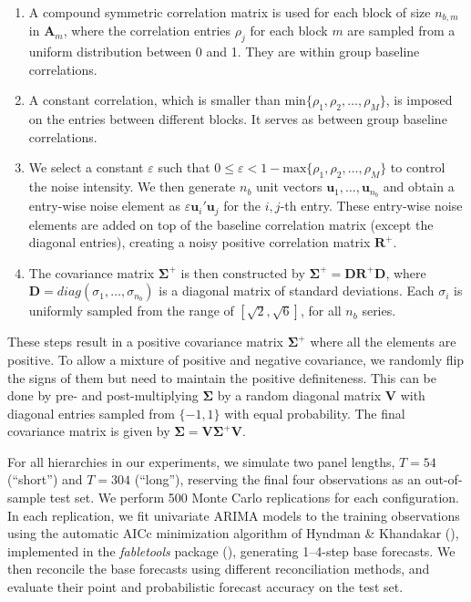 \documentclass[
  11pt,
  letterpaper,
  DIV=11,
  numbers=noendperiod,
  titlepage]{scrartcl}
\begin{document}
\begin{enumerate}
\def\labelenumi{\arabic{enumi}.}
\item
  A compound symmetric correlation matrix is used for each block of size
  \(n_{b,m}\) in \(\boldsymbol{A}_m\), where the correlation entries
  \(\rho_j\) for each block \(m\) are sampled from a uniform
  distribution between 0 and 1. They are within group baseline
  correlations.
\item
  A constant correlation, which is smaller than
  \(\text{min} \{\rho_1, \rho_2, \dots, \rho_M \}\), is imposed on the
  entries between different blocks. It serves as between group baseline
  correlations.
\item
  We select a constant \(\varepsilon\) such that
  \(0 \le \varepsilon < 1 - \text{max} \{\rho_1, \rho_2, \dots, \rho_M \}\)
  to control the noise intensity. We then generate \(n_b\) unit vectors
  \(\boldsymbol{u}_1, \dots, \boldsymbol{u}_{n_b}\) and obtain a
  entry-wise noise element as
  \(\varepsilon \boldsymbol{u}_i' \boldsymbol{u}_j\) for the \(i,j\)-th
  entry. These entry-wise noise elements are added on top of the
  baseline correlation matrix (except the diagonal entries), creating a
  noisy positive correlation matrix \(\boldsymbol{R}^+\).
\item
  The covariance matrix \(\boldsymbol{\Sigma}^+\) is then constructed by
  \(\boldsymbol{\Sigma}^+ = \boldsymbol{D} \boldsymbol{R}^+ \boldsymbol{D}\),
  where \(\boldsymbol{D} = diag(\sigma_1, \dots, \sigma_{n_b})\) is a
  diagonal matrix of standard deviations. Each \(\sigma_i\) is uniformly
  sampled from the range of \([\sqrt{2}, \sqrt{6}]\), for all \(n_b\)
  series.
\end{enumerate}

These steps result in a positive covariance matrix
\(\boldsymbol{\Sigma}^+\) where all the elements are positive. To allow
a mixture of positive and negative covariance, we randomly flip the
signs of them but need to maintain the positive definiteness. This can
be done by pre- and post-multiplying \(\boldsymbol{\Sigma}\) by a random
diagonal matrix \(\boldsymbol{V}\) with diagonal entries sampled from
\(\{-1, 1\}\) with equal probability. The final covariance matrix is
given by
\(\boldsymbol{\Sigma} = \boldsymbol{V} \boldsymbol{\Sigma}^+ \boldsymbol{V}\).

For all hierarchies in our experiments, we simulate two panel lengths,
\(T=54\) (``short'') and \(T=304\) (``long''), reserving the final four
observations as an out-of-sample test set. We perform 500 Monte Carlo
replications for each configuration. In each replication, we fit
univariate ARIMA models to the training observations using the automatic
AICc minimization algorithm of Hyndman \& Khandakar
(), implemented in the
\emph{fabletools} package (), generating 1--4-step base forecasts. We then reconcile
the base forecasts using different reconciliation methods, and evaluate
their point and probabilistic forecast accuracy on the test set.
\end{document}
